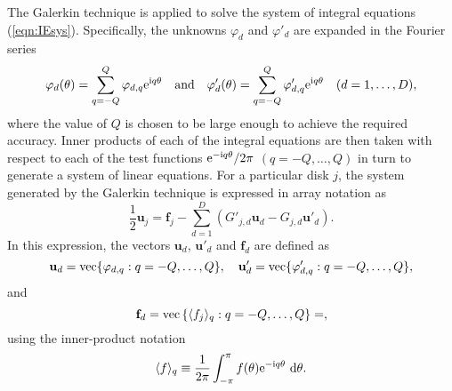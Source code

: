 \documentclass[12pt,a4paper]{article}
\newcommand{\vpr}{{\varphi}}
\newcommand{\bu}{\textbf{u}}
\newcommand{\bfI}{\textbf{f}}
\newcommand{\force}{f}
\begin{document}
The Galerkin technique is applied to solve the system of integral equations (\ref{eqn:IEsys}).
Specifically, the unknowns $\vpr_{d}$ and $\vpr'_{d}$ are expanded in the Fourier series
\begin{equation}
\vpr_{d}(\theta)
=
\sum_{q=-Q}^{Q}
\vpr_{d,q}
\exp^{\ci q\theta}
\quad
\text{and}
\quad
\vpr'_{d}(\theta)
=
\sum_{q=-Q}^{Q}
\vpr'_{d,q}
\exp^{\ci q\theta}
\quad
(d=1,\dots,D),
\end{equation}
where the value of $Q$ is chosen to be large enough to achieve the required accuracy.
Inner products of each of the integral equations are then taken with respect to each of the test functions 
${\rm e}^{-{\mathrm i} q \theta}/2\pi$ $(q=-Q,\dots,Q)$ in turn to generate a system of linear equations.
For a particular disk $j$, the system generated by the Galerkin technique is expressed in array notation as
\begin{equation}\label{eqn:GalSys}
\frac{1}{2}
\bu_{j}
=
\bfI_{j}
-
\sum_{d=1}^{D}
\left(
G'_{j,d}
\bu_{d}
-
G_{j,d}
\bu'_{d}
\right)
.
\end{equation}
In this expression, the vectors $\bu_{d}$, $\bu'_{d}$ and $\bfI_{d}$ are defined as
\begin{equation}
\bu_{d} =  
\vec\{
\vpr_{d,q}
:
q=-Q,\dots,Q\}
,
\quad
\bu_{d}' =  
\vec\{
\vpr_{d,q}'
:
q=-Q,\dots,Q\},
\end{equation}
and
\begin{equation}
\bfI_{d}
=
\vec
\left\{
\langle
\force_{j}
\rangle_{q}
:
q=-Q,\dots,Q
\right\}
=
,
\end{equation}
using the inner-product notation
\begin{equation}
\langle 
f
\rangle_{q}
\equiv
\frac{1}{2\pi}
\int_{-\pi}^{\pi}
f(\theta){\rm e}^{-{\mathrm i} q \theta}~ {\rm d}\theta.
\end{equation}
\end{document}
